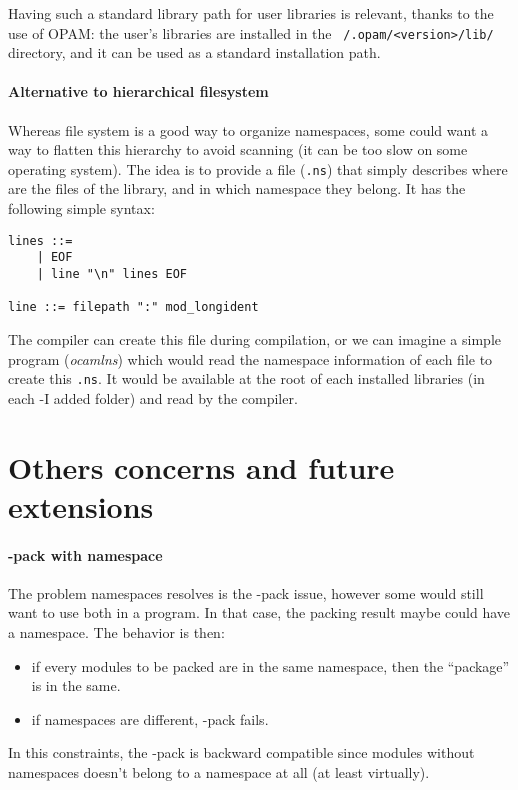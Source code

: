 \documentclass[11pt,a4paper]{article}
\begin{document}
Having such a standard library path for user libraries is relevant, thanks to
the use of OPAM: the user's libraries are installed in the
\texttt{~/.opam/<version>/lib/} directory, and it can be used as a standard
installation path. 

\paragraph{Alternative to hierarchical filesystem}

Whereas file system is a good way to organize namespaces, some could want a way
to flatten this hierarchy to avoid scanning (it can be too slow on some
operating system). The idea is to provide a file (\texttt{.ns}) that simply
describes where are the files of the library, and in which namespace they
belong. It has the following simple syntax:

\begin{verbatim}
lines ::=
    | EOF
    | line "\n" lines EOF

line ::= filepath ":" mod_longident
\end{verbatim}

The compiler can create this file during compilation, or we can imagine a simple
program (\emph{ocamlns}) which would read the namespace information of each file
to create this \texttt{.ns}. It would be available at the root of each installed
libraries (in each -I added folder) and read by the compiler.


\section{Others concerns and future extensions}

\paragraph{-pack with namespace}

The problem namespaces resolves is the -pack issue, however some would still
want to use both in a program. In that case, the packing result maybe could have
a namespace. The behavior is then:
\begin{itemize}
\item if every modules to be packed are in the same namespace, then the
  ``package'' is in the same.
\item if namespaces are different, -pack fails.
\end{itemize}

In this constraints, the -pack is backward compatible since modules without
namespaces doesn't belong to a namespace at all (at least virtually).
\end{document}
